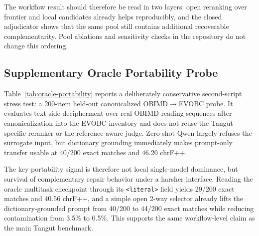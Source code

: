 

The workflow result should therefore be read in two layers: open reranking over frontier and local candidates already helps reproducibly, and the closed adjudicator shows that the same pool still contains additional recoverable complementarity. Pool ablations and sensitivity checks in the repository do not change this ordering.

\subsection{Supplementary Oracle Portability Probe}

Table~\ref{tab:oracle-portability} reports a deliberately conservative second-script stress test: a 200-item held-out canonicalized OBIMD$\rightarrow$EVOBC probe. It evaluates text-side decipherment over real OBIMD reading sequences after canonicalization into the EVOBC inventory and does not reuse the Tangut-specific reranker or the reference-aware judge. Zero-shot Qwen largely refuses the surrogate input, but dictionary grounding immediately makes prompt-only transfer usable at 40/200 exact matches and 46.20 chrF++.



The key portability signal is therefore not local single-model dominance, but survival of complementary repair behavior under a harsher interface. Reading the oracle multitask checkpoint through its \texttt{<literal>} field yields 29/200 exact matches and 40.56 chrF++, and a simple open 2-way selector already lifts the dictionary-grounded prompt from 40/200 to 44/200 exact matches while reducing contamination from 3.5\% to 0.5\%. This supports the same workflow-level claim as the main Tangut benchmark.
